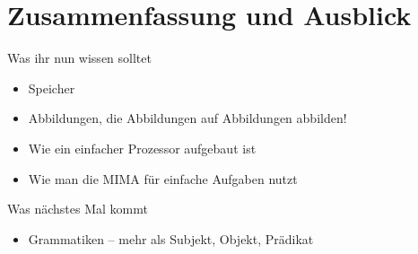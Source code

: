 %






\appendix
\beginbackup

\section{Zusammenfassung und Ausblick}

\begin{frame}	
	\begin{block}{Was ihr nun wissen solltet}
		\begin{itemize}
			\item Speicher
			\item Abbildungen, die Abbildungen auf Abbildungen abbilden!
			\item Wie ein einfacher Prozessor aufgebaut ist
			\item Wie man die MIMA für einfache Aufgaben nutzt
		\end{itemize}
	\end{block}
	
	\begin{block}{Was nächstes Mal kommt}
		\begin{itemize}
			\item Grammatiken – mehr als Subjekt, Objekt, Prädikat
		\end{itemize}
	\end{block}
\end{frame}




\backupend

